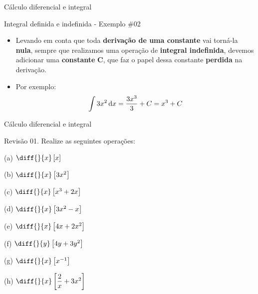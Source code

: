\begin{frame}{Cálculo diferencial e integral}
	\begin{block}{Integral definida e indefinida - Exemplo \#02}
		\begin{itemize}
			\item Levando em conta que toda \textbf{derivação de uma constante} vai torná-la \textbf{nula}, sempre que realizamos uma operação de \textbf{integral indefinida}, devemos adicionar uma \textbf{constante} $ \bm{C} $, que faz o papel dessa constante \textbf{perdida} na derivação.
			\item Por exemplo:\[ \int 3x^{2} \dif x=\dfrac{3x^{3}}{3} + C=x^{3}+C \]
		\end{itemize}
	\end{block}
\end{frame}


\begin{frame}{Cálculo diferencial e integral}
	\begin{block}{Revisão}
		01. Realize as seguintes operações:
		
		\smallskip
		
		\begin{minipage}{0.49\linewidth}
			(a) $ \diff{}{x}\sbr{x} $
			
			\vspace{0.5cm}
			
			(b) $ \diff{}{x}\sbr{3x^{2}} $
			
			\vspace{0.5cm}
			
			(c) $ \diff{}{x}\sbr{x^{3}+2x} $
			
			\vspace{0.5cm}
			
			(d) $ \diff{}{x}\sbr{3x^{2}-x} $
		\end{minipage}
		\hfill
		\begin{minipage}{0.49\linewidth}
			(e) $ \diff{}{x}\sbr{4x+2x^{2}} $
			
			\vspace{0.5cm}
			
			(f) $ \diff{}{y}\sbr{4y+3y^{2}} $
			
			\vspace{0.5cm}
			
			(g) $ \diff{}{x}\sbr{x^{-1}} $
			
			\vspace{0.5cm}
			
			(h) $ \diff{}{x}\sbr{\dfrac{2}{x}+3x^{2}} $
		\end{minipage}
	\end{block}
\end{frame}


